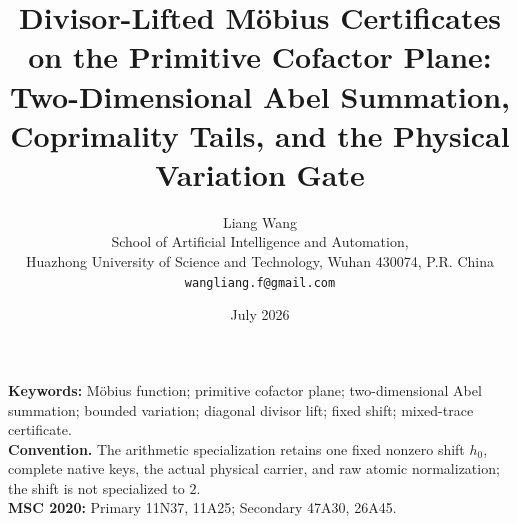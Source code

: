 \documentclass[11pt]{article}
\title{Divisor-Lifted M\"obius Certificates on the Primitive Cofactor Plane:\\
Two-Dimensional Abel Summation, Coprimality Tails, and the Physical Variation Gate}
\author{Liang Wang\\
School of Artificial Intelligence and Automation,\\
Huazhong University of Science and Technology, Wuhan 430074, P.R. China\\
\texttt{wangliang.f@gmail.com}}
\date{July 2026}
\theoremstyle{remark}
\begin{document}
\maketitle


\noindent\textbf{Keywords:} M\"obius function; primitive cofactor plane;
two-dimensional Abel summation; bounded variation; diagonal divisor lift;
fixed shift; mixed-trace certificate.\\[0.5em]
\noindent\textbf{Convention.} The arithmetic specialization retains one fixed
nonzero shift \(h_0\), complete native keys, the actual physical carrier, and
raw atomic normalization; the shift is not specialized to \(2\).\\[0.5em]
\noindent\textbf{MSC 2020:} Primary 11N37, 11A25; Secondary 47A30, 26A45.












\begingroup
\small
\raggedright


\endgroup
\end{document}
